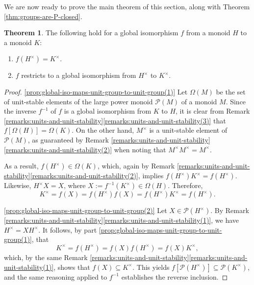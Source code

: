 \documentclass[11pt,reqno]{amsart}
\theoremstyle{definition}
\newtheorem{theorem}{Theorem}[section]
\theoremstyle{remark}
\theoremstyle{theoremdd}
\renewcommand{\,}{\kern 0.1em}
\begin{document}
We are now ready to prove the main theorem of this section, along with Theorem \ref{thm:groups-are-P-closed}.

\begin{theorem}
\label{thm:global-iso-maps-unit-group-to-unit-group}
The following hold for a global isomorphism $f$ from a monoid $H$ to a monoid $K$:
%
\begin{enumerate}[label=\textup{(\roman{*})}]
\item\label{prop:global-iso-maps-unit-group-to-unit-group(1)} 
$f(H^\times) = K^\times$.
\item\label{prop:global-iso-maps-unit-group-to-unit-group(2)} $f$ restricts to a global isomorphism from $H^\times$ to $K^\times$.
\end{enumerate}
\end{theorem}

\begin{proof}
\ref{prop:global-iso-maps-unit-group-to-unit-group(1)} Let $\Omega(M)$ be the set of unit-stable elements of the large power monoid $\mathcal P(M)$ of a monoid $M$. Since the inverse $f^{-1}$ of $f$ is a global isomorphism from $K$ to $H$, it is clear from Remark \ref{remarks:units-and-unit-stability}\ref{remarks:units-and-unit-stability(3)} that $f[\Omega(H)] = \Omega(K)$. On the other hand, $M^\times$ is a unit-stable element of $\mathcal P(M)$, as guaranteed by Remark \ref{remarks:units-and-unit-stability}\ref{remarks:units-and-unit-stability(2)} when noting that $M^\times M^\times = M^\times$.


As a result, $f(H^\times) \in \Omega(K)$, which, again by Remark \ref{remarks:units-and-unit-stability}\ref{remarks:units-and-unit-stability(2)}, implies $f(H^\times) K^\times = f(H^\times)$. Likewise, $H^\times X = X$, where $X := f^{-1}(K^\times) \in \Omega(H)$. Therefore, 
\[
K^\times = f(X) = f(H^\times) f(X) = f(H^\times) K^\times = f(H^\times).
\]

\ref{prop:global-iso-maps-unit-group-to-unit-group(2)} 
Let $X \in \mathcal P(H^\times)$. By Remark \ref{remarks:units-and-unit-stability}\ref{remarks:units-and-unit-stability(1)}, we have $H^\times = \allowbreak XH^\times$. It follows, by part \ref{prop:global-iso-maps-unit-group-to-unit-group(1)}, that
\[
K^\times = \allowbreak f(H^\times) = \allowbreak f(X) f(H^\times) = f(X) K^\times, 
\]
which, by the same Remark \ref{remarks:units-and-unit-stability}\ref{remarks:units-and-unit-stability(1)}, shows that $f(X) \subseteq \allowbreak K^\times$. This yields $f[\mathcal P(H^\times)] \subseteq \mathcal P(K^\times)$, and the same reasoning applied to $f^{-1}$ establishes the reverse inclusion.
\end{proof}
\end{document}

